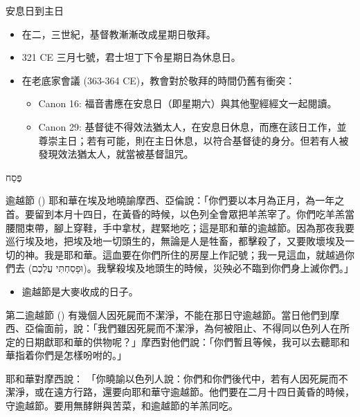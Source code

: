 \documentclass{beamer}
\newcommand{\topic}[1]{
  \begin{frame}
    \centering
    \vspace*{1cm}
    {\fontsize{40}{48}\selectfont #1\par}
    \vfill
  \end{frame}
}
\newcommand{\parvspace}{\par\vspace{0.5em}}
\begin{document}
\begin{frame}{安息日到主日}
  \begin{itemize}
    \item 在二，三世紀，基督教漸漸改成星期日敬拜。\parencite{SabbathInChristianity}
    \item 321 CE 三月七號，君士坦丁下令星期日為休息日。\parencite{SabbathInChristianity}
    \item 在老底家會議 (363-364 CE)，教會對於敬拜的時間仍舊有衝突\parencite{SynodOfLaodicea}：
      \begin{itemize}
        \item Canon 16: 福音書應在安息日（即星期六）與其他聖經經文一起閱讀。
        \item Canon 29: 基督徒不得效法猶太人，在安息日休息，而應在該日工作，並尊崇主日；若有可能，則在主日休息，以符合基督徒的身分。但若有人被發現效法猶太人，就當被基督詛咒。
      \end{itemize}
  \end{itemize}
\end{frame}

\topic{\texthebrew{פֶּסַח}}

\begin{frame}{逾越節}
  () 耶和華在埃及地曉諭摩西、亞倫說：「你們要以\alert{本月為正月}，為一年之首。\textellipsis{}要留到\alert{本月十四日}，在黃昏的時候，以色列全會眾把羊羔宰了。\textellipsis{}你們吃羊羔當腰間束帶，腳上穿鞋，手中拿杖，趕緊地吃；這是耶和華的逾越節。因為那夜我要巡行埃及地，把埃及地一切頭生的，無論是人是牲畜，都擊殺了，又要敗壞埃及一切的神。我是耶和華。這血要在你們所住的房屋上作記號；我一見這血，\alert{就越過你們去 (\texthebrew{וּפָסַחְתִּי עֲלֵכֶם})}。我擊殺埃及地頭生的時候，災殃必不臨到你們身上滅你們。」\parvspace
  \begin{itemize}
    \item 逾越節是大麥收成的日子。
  \end{itemize}
\end{frame}

\begin{frame}{第二逾越節}
  () 有幾個人因死屍而不潔淨，不能在那日守逾越節。當日他們到摩西、亞倫面前，說：「我們雖因死屍而不潔淨，為何被阻止、不得同以色列人在所定的日期獻耶和華的供物呢？」摩西對他們說：「你們暫且等候，我可以去聽耶和華指着你們是怎樣吩咐的。」\parvspace
  耶和華對摩西說： 「你曉諭以色列人說：你們和你們後代中，若有人因死屍而不潔淨，或在遠方行路，還要向耶和華守逾越節。他們要在\alert{二月十四日黃昏的時候，守逾越節}。要用無酵餅與苦菜，和逾越節的羊羔同吃。\parvspace
\end{frame}
\end{document}
